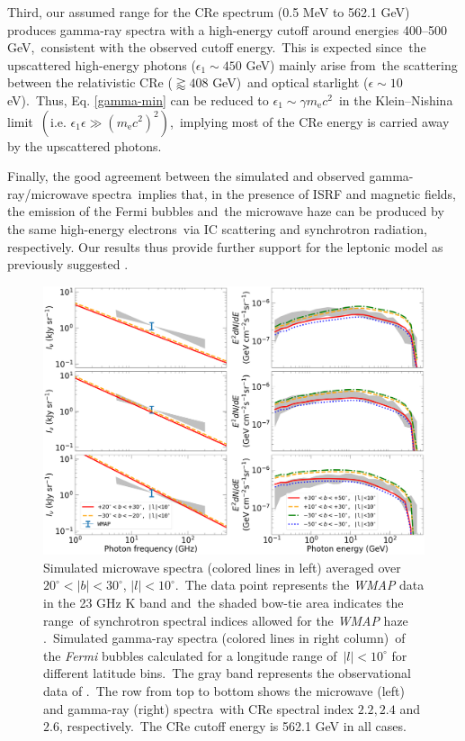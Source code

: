 \documentclass[fleqn,usenatbib,useAMS]{mnras}
\begin{document}
Third, our assumed range for the CRe spectrum (0.5 MeV to 562.1 GeV) produces gamma-ray spectra with a high-energy cutoff around energies 400--500 GeV,\
consistent with the observed cutoff energy.\
This is expected since\
the upscattered high-energy photons ($\epsilon_{1}\sim450$ GeV) mainly arise from\
the scattering between the relativistic CRe ($\gtrapprox 408$ GeV)\
and optical starlight ($\epsilon \sim 10$ eV).\
Thus, Eq. \ref{gamma-min} can be reduced to $\epsilon_{1}\sim\gamma m_{\text{e}}c^2$\
in the Klein--Nishina limit\
$\left(\text{i.e. }\epsilon_{1}\epsilon \gg \left(m_{\text{e}}c^2\right)^2\right)$,\
implying most of the CRe energy is carried away by the upscattered photons.

Finally, the good agreement between the simulated and observed gamma-ray/microwave spectra\
implies that, in the presence of ISRF and magnetic fields, the emission of the Fermi bubbles and\
the microwave haze can be produced by the same high-energy electrons\
via IC scattering and synchrotron radiation, respectively. Our results thus provide further support for the leptonic model as previously suggested \citep{Su2010, Ackermann2014, Yang2013, Yang2022}.

\begin{figure}
  \includegraphics[width=\linewidth]{figures/fig__spectrum.png}
  \caption{
      Simulated microwave spectra (colored lines in left) averaged over $20^{\circ}<|b|<30^{\circ}$, $|l|<10^{\circ}$.\
      The data point represents the \textit{WMAP} data in the 23 GHz K band and\
      the shaded bow-tie area indicates the range\
      of synchrotron spectral indices allowed for the \textit{WMAP} haze \citep{Dobler_2008}.\
      Simulated gamma-ray spectra (colored lines in right column)\
      of the \textit{Fermi} bubbles calculated for a longitude range of\
      $|l|<10^{\circ}$ for different latitude bins.\
      The gray band represents the observational data of \citet{Ackermann2014}.\
      The row from top to bottom shows the microwave (left) and gamma-ray (right) spectra\
      with CRe spectral index $2.2, 2.4$ and $2.6$, respectively.\
      The CRe cutoff energy is 562.1 GeV in all cases.
  }
  \label{fig__gammaRaySynchtronSpectrum}
\end{figure}
\end{document}
